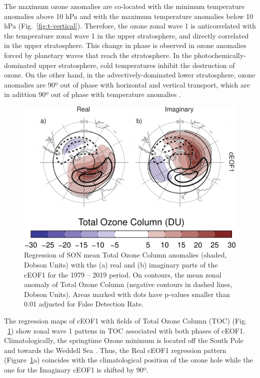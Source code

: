 \documentclass[smallextended]{svjour3}       %
\begin{document}
The maximum ozone anomalies are co-located with the minimum temperature anomalies above 10 hPa and with the maximum temperature anomalies below 10 hPa (Fig.~\ref{fig:t-vertical}). Therefore, the ozone zonal wave 1 is anticorrelated with the temperature zonal wave 1 in the upper stratosphere, and directly correlated in the upper stratosphere. This change in phase is observed in ozone anomalies forced by planetary waves that reach the stratosphere. In the photochemically-dominated upper stratosphere, cold temperatures inhibit the destruction of ozone. On the other hand, in the advectively-dominated lower stratosphere, ozone anomalies are 90º out of phase with horizontal and vertical transport, which are in adittion 90º out of phase with temperature anomalies \citep{hartmann1979, wirth1993, smith1995}.



\begin{figure}
\centering
\includegraphics{../figures/o3-regr-1.pdf}
\caption{\label{fig:o3-regr}Regression of SON mean Total Ozone Column anomalies (shaded, Dobson Units) with the (a) real and (b) imaginary parts of the cEOF1 for the 1979 -- 2019 period. On contours, the mean zonal anomaly of Total Ozone Column (negative contours in dashed lines, Dobson Units). Areas marked with dots have p-values smaller than 0.01 adjusted for False Detection Rate.}
\end{figure}

The regression maps of cEOF1 with fields of Total Ozone Column (TOC) (Fig. ~\ref{fig:o3-regr}) show zonal wave 1 pattens in TOC associated with both phases of cEOF1. Climatologically, the springtime Ozone minimum is located off the South Pole and towards the Weddell Sea \citep{grytsai2011}.
Thus, the Real cEOF1 regression pattern (Figure~\ref{fig:o3-regr}a) coincides with the climatological position of the ozone hole while the one for the Imaginary cEOF1 is shifted by 90º.
\end{document}
